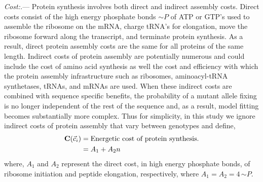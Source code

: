 \documentclass[12pt,letterpaper]{article}
\renewcommand{\subsubsection}[1]{%
\vspace{2ex}
\noindent
\textit{#1.}---}
\newcommand{\Costcveci}{\ensuremath{\Cost(\cveci)}\xspace}
\newcommand{\Cost}{\ensuremath{\text{\textbf{C}}}\xspace}
\newcommand{\simP}{\ensuremath{\sim P}\xspace}
\newcommand{\cveci}{\ensuremath{\cvec_i}\xspace}
\newcommand{\cvec}{\ensuremath{\Vec{c}}\xspace}
\begin{document}
\subsubsection{Cost:}
Protein synthesis involves both direct and indirect assembly costs.
Direct costs consist of the high energy phosphate bonds \simP of ATP or GTP's used to assemble the ribosome on the mRNA, charge tRNA's for elongation, move the ribosome forward along the transcript, and terminate protein synthesis.
As a result, direct protein assembly costs are the same for all proteins of the same length.
Indirect costs of protein assembly are potentially numerous and could include the cost of amino acid synthesis as well the cost and efficiency with which the protein assembly infrastructure such as ribosomes, aminoacyl-tRNA synthetases, tRNAs, and mRNAs are used.
When these indirect costs are combined with sequence specific benefits, the probability of a mutant allele fixing is no longer independent of the rest of the sequence \citep{GilchristEtAl2015} and, as a result, model fitting becomes substantially more complex.
Thus for simplicity, in this study we ignore indirect costs of protein assembly that vary between genotypes and define,
\begin{align}
\label{eq:defineCost}
  \Costcveci  &= \text{Energetic cost of protein synthesis.}\\
  &= A_1 + A_2 n
\end{align}
where, $A_1$ and $A_2$ represent the direct cost, in high energy phosphate bonds, of ribosome initiation and peptide elongation, respectively, where $A_1 = A_2 = 4  \, \simP$.
\end{document}
